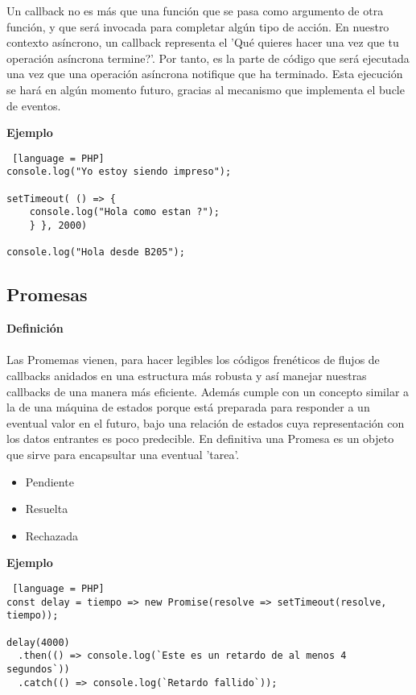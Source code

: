 \documentclass[a4paper, 12pt]{article}
\begin{document}
Un callback no es m\'as que una funci\'on que se pasa como argumento de otra funci\'on, y que ser\'a invocada para completar alg\'un tipo de acci\'on. En nuestro contexto as\'incrono, un callback representa el 'Qu\'e quieres hacer una vez que tu operaci\'on as\'incrona termine?'. Por tanto, es la parte de c\'odigo que ser\'a ejecutada una vez que una operaci\'on as\'incrona notifique que ha terminado. Esta ejecuci\'on se har\'a en alg\'un momento futuro, gracias al mecanismo que implementa el bucle de eventos.  \\

{\bf Ejemplo

\begin{lstlisting} [language = PHP]
console.log("Yo estoy siendo impreso");

setTimeout( () => {
	console.log("Hola como estan ?");
	} }, 2000)

console.log("Hola desde B205");

\end{lstlisting}

\subsection*{Promesas}
{\bf Definici\'on}\\ \\
Las Promemas vienen, para hacer legibles los c\'odigos fren\'eticos  de flujos de callbacks anidados en una estructura m\'as robusta y as\'i manejar nuestras callbacks de una manera m\'as eficiente. Adem\'as cumple con un concepto similar a la de una m\'aquina de estados porque est\'a preparada para responder a un eventual valor en el futuro, bajo una relaci\'on de estados cuya representaci\'on con los datos entrantes es poco predecible. En definitiva una Promesa es un objeto que sirve para encapsultar una eventual 'tarea'. \\

\begin{itemize}
	\item Pendiente
	\item Resuelta 
	\item Rechazada 
\end{itemize} 

{\bf Ejemplo }

\begin{lstlisting} [language = PHP]
const delay = tiempo => new Promise(resolve => setTimeout(resolve, tiempo));

delay(4000)
  .then(() => console.log(`Este es un retardo de al menos 4 segundos`))
  .catch(() => console.log(`Retardo fallido`));


\end{lstlisting}}
\end{document}
